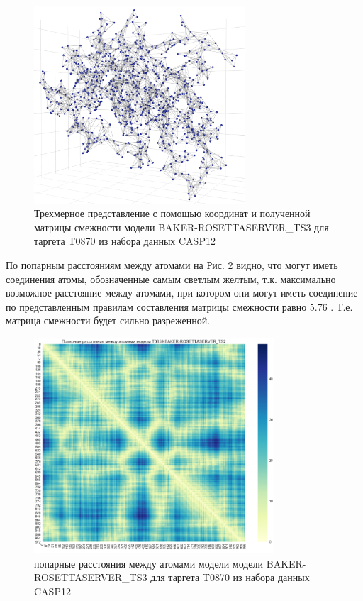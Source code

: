 \documentclass[14pt]{extarticle}
\begin{document}
\begin{figure}[H]
		\centering
		\includegraphics[width=0.7\textwidth]{3d_graph.pdf}
			\caption{Трехмерное представление с помощью координат и полученной матрицы смежности модели BAKER-ROSETTASERVER\_TS3 для таргета T0870 из набора данных CASP12}
			\label{fig:3Dgraph}
\end{figure}
По попарным расстояниям между атомами на Рис. \ref{protein_vis} видно, что могут иметь соединения атомы, обозначенные самым светлым желтым, т.к. максимально возможное расстояние между атомами, при котором они могут иметь соединение по представленным правилам составления матрицы смежности равно 5.76 . Т.е. матрица смежности будет сильно разреженной.

	\begin{figure}[H]
		\centering
		\includegraphics[width=0.8\textwidth]{pairwise.pdf}
		\caption{попарные расстояния между атомами модели модели BAKER-ROSETTASERVER\_TS3 для таргета T0870 из набора данных CASP12}
		\label{protein_vis}
\end{figure}
\end{document}
